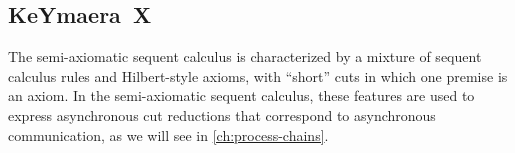 
\subsection{KeYmaera~X}

The semi-axiomatic sequent calculus is characterized by a mixture of sequent calculus rules and Hilbert-style axioms, with ``short'' cuts in which one premise is an axiom.
In the semi-axiomatic sequent calculus, these features are used to express asynchronous cut reductions that correspond to asynchronous communication, as we will see in \cref{ch:process-chains}.
 
